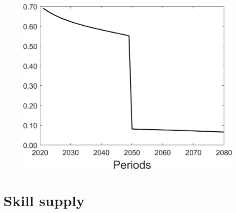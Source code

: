 \begin{figure}[h!!]
\begin{minipage}[]{0.32\textwidth}
	\end{minipage}
	\begin{minipage}[]{0.32\textwidth}
	\includegraphics[width=1\textwidth]{../../codding_model/Own/figures/Rep_agent/staticonlyRam_separate_lambdaa_periods59_eppsilon0.40_zeta1.40_Ad08_Ac04_thetac0.70_thetad0.56_HetGrowth1_tauul0.181_util0_withtarget1_lgd0.png}
\end{minipage}
\end{figure}



\section{Skill supply}
